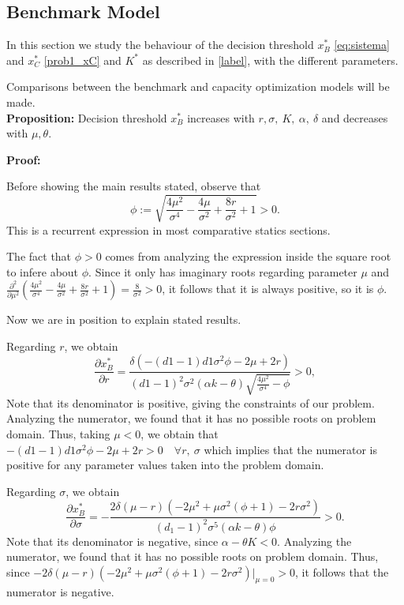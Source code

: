 \subsection{Benchmark Model}
In this section we study the behaviour of the decision threshold $x^*_B$ \eqref{eq:sistema} and $x^*_{C}$ \eqref{prob1_xC} and $K^*$ as described in \eqref{label}, with
the different parameters.

Comparisons between the benchmark and capacity optimization models will be made.\\
\textbf{Proposition:}
Decision threshold $x^*_B$ increases with $r, \sigma, \ K, \ \alpha, \ \delta$ and decreases with $\mu, \theta$.


\textbf{Proof:}

Before showing the main results stated, observe that
$$\phi:=\sqrt{\frac{4 \mu ^2}{\sigma ^4}-\frac{4 \mu }{\sigma ^2}+\frac{8 r}{\sigma ^2}+1}>0
\label{phi}.$$
This is a recurrent expression in most comparative statics sections.

The fact that $\phi>0$ comes from analyzing the expression inside the square root to infere about $\phi$. Since it only has imaginary roots regarding parameter $\mu$ and $\frac{\partial^2}{\partial \mu^2} \left( \frac{4 \mu ^2}{\sigma ^4}-\frac{4 \mu }{\sigma ^2}+\frac{8 r}{\sigma ^2}+1 \right) =\frac{8}{\sigma^2}>0$, it follows that it is always positive, so it is $\phi$.

Now we are in position to explain stated results.

Regarding $r$, we obtain
$$\frac{\partial x^*_B}{\partial r}=\frac{\delta  \left(-(d1-1) d1 \sigma ^2 \phi-2 \mu +2 r \right)}{(d1-1)^2 \sigma ^2 (\alpha  k-\theta ) \sqrt{\frac{4 \mu ^2}{\sigma ^4}-\phi}}>0,$$
Note that its denominator is positive, giving the constraints of our problem.
Analyzing the numerator, we found that it has no possible roots on problem domain. Thus, taking $\mu<0$, we obtain that $-(d1-1) d1 \sigma ^2 \phi-2 \mu +2 r>0 \quad \forall r, \ \sigma$ which implies that the numerator is positive for any parameter values taken into the problem domain.

Regarding $\sigma$, we obtain
$$\frac{\partial x^*_B}{\partial \sigma}=-\frac{2 \delta  (\mu -r) \left(-2 \mu ^2+\mu  \sigma ^2 \left(\phi+1\right)-2 r \sigma ^2\right)}{(d_1-1)^2 \sigma ^5 (\alpha  k-\theta ) \phi}>0.$$
Note that its denominator is negative, since $\alpha-\theta K<0$.
Analyzing the numerator, we found that it has no possible roots on problem domain. Thus, since $-2 \delta  (\mu -r) \left(-2 \mu ^2+\mu  \sigma ^2 \left(\phi+1\right)-2 r \sigma ^2\right) |_{\mu=0}>0$, it follows that the numerator is negative.

